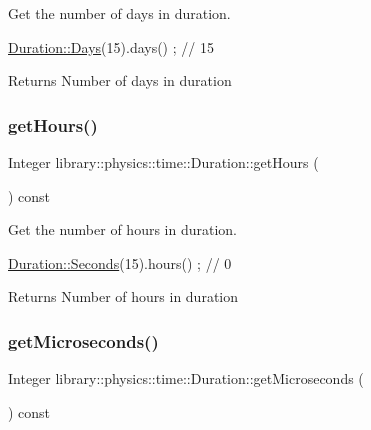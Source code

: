 Get the number of days in duration. 


\begin{DoxyCode}
\hyperlink{classlibrary_1_1physics_1_1time_1_1_duration_abf1323fa113b5203747ce9aec5c969fc}{Duration::Days}(15).days() ; \textcolor{comment}{// 15}
\end{DoxyCode}


\begin{DoxyReturn}{Returns}
Number of days in duration 
\end{DoxyReturn}
\mbox{\label{classlibrary_1_1physics_1_1time_1_1_duration_a05ef46de76556cd571fd8a218dc3b24f}} 
\subsubsection{\texorpdfstring{get\+Hours()}{getHours()}}
{\footnotesize\ttfamily Integer library\+::physics\+::time\+::\+Duration\+::get\+Hours (\begin{DoxyParamCaption}{ }\end{DoxyParamCaption}) const}



Get the number of hours in duration. 


\begin{DoxyCode}
\hyperlink{classlibrary_1_1physics_1_1time_1_1_duration_ae10891c94a1b2278c444cb44b37132f1}{Duration::Seconds}(15).hours() ; \textcolor{comment}{// 0}
\end{DoxyCode}


\begin{DoxyReturn}{Returns}
Number of hours in duration 
\end{DoxyReturn}
\mbox{\label{classlibrary_1_1physics_1_1time_1_1_duration_a65db73a28d87e3f06d307cbd688739a3}} 
\subsubsection{\texorpdfstring{get\+Microseconds()}{getMicroseconds()}}
{\footnotesize\ttfamily Integer library\+::physics\+::time\+::\+Duration\+::get\+Microseconds (\begin{DoxyParamCaption}{ }\end{DoxyParamCaption}) const}



